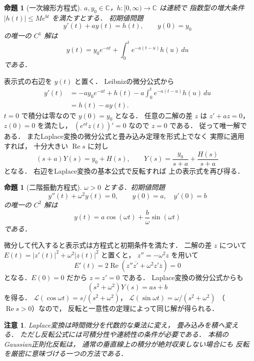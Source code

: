 \documentclass[a5paper,10pt,onecolumn]{jsarticle}
\makeatletter
\theoremstyle{mathnotetheorem}
\newtheorem{proposition}[theorem]{命題}
\newtheorem{remark}[theorem]{注意}
\renewcommand{\proofname}{証明}
\renewenvironment{proof}[1][\proofname]{%
  \par\pushQED{\qed}\normalfont\topsep4\p@\@plus2\p@\relax
  \trivlist\item[\hskip\labelsep\bfseries #1]\ignorespaces
}{\popQED\endtrivlist\@endpefalse}
\makeatother
\begin{document}
\begin{proposition}[一次線形方程式]\label{prop:ode1}
$a,y_0\in\mathbb C$，$h:[0,\infty)\to\mathbb C$ は連続で
指数型の増大条件
$|h(t)|\le Me^{bt}$ を満たすとする．
初期値問題
\[
 y'(t)+ay(t)=h(t),\qquad y(0)=y_0
\]
の唯一の $C^1$ 解は
\[
 y(t)=y_0e^{-at}
 +\int_0^t e^{-a(t-u)}h(u)\,du
\]
である．
\end{proposition}
\begin{proof}
表示式の右辺を $y(t)$ と置く．
Leibnizの微分公式から
\begin{align*}
 y'(t)
 &=-ay_0e^{-at}+h(t)
   -a\int_0^te^{-a(t-u)}h(u)\,du\\
 &=h(t)-ay(t).
\end{align*}
$t=0$ で積分は零なので $y(0)=y_0$ となる．
任意の二解の差 $z$ は $z'+az=0$，$z(0)=0$ を満たし，
$(e^{at}z(t))'=0$ なので $z=0$ である．
従って唯一解である．
またLaplace変換の微分公式と畳み込み定理を形式上でなく
実際に適用すれば，
十分大きい $\operatorname{Re}s$ に対し
\[
 (s+a)Y(s)=y_0+H(s),\qquad
 Y(s)=\frac{y_0}{s+a}+\frac{H(s)}{s+a}
\]
となる．
右辺をLaplace変換の基本公式で反転すれば
上の表示式を再び得る．
\end{proof}

\begin{proposition}[二階振動方程式]\label{prop:oscillator}
$\omega>0$ とする．初期値問題
\[
 y''(t)+\omega^2y(t)=0,\qquad
 y(0)=a,\quad y'(0)=b
\]
の唯一の $C^2$ 解は
\[
 y(t)=a\cos(\omega t)+
 \frac b\omega\sin(\omega t)
\]
である．
\end{proposition}
\begin{proof}
微分して代入すると表示式は方程式と初期条件を満たす．
二解の差 $z$ について
$E(t)=|z'(t)|^2+\omega^2|z(t)|^2$ と置くと，
$z''=-\omega^2z$ を用いて
\[
 E'(t)=2\operatorname{Re}
 (z''\overline{z'}+\omega^2z'\overline z)=0
\]
となる．$E(0)=0$ だから $z=z'=0$ である．
Laplace変換の微分公式からも
\[
 (s^2+\omega^2)Y(s)=as+b
\]
を得る．
$\mathcal L(\cos\omega t)=s/(s^2+\omega^2)$，
$\mathcal L(\sin\omega t)=\omega/(s^2+\omega^2)$
（$\operatorname{Re}s>0$）なので，
反転と一意性の定理によって同じ解が得られる．
\end{proof}

\begin{remark}
Laplace変換は時間微分を代数的な乗法に変え，
畳み込みを積へ変える．
ただし反転公式には可積分性や連続性の条件が必要である．
本稿のGaussian正則化反転は，
通常の垂直線上の積分が絶対収束しない場合にも
反転を厳密に意味づける一つの方法である．
\end{remark}
\end{document}
